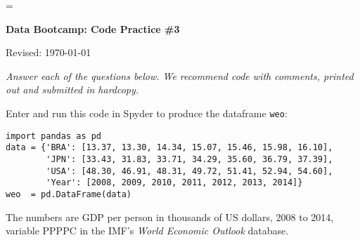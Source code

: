 \documentclass[11pt]{exam}
\begin{document}
\parskip=\bigskipamount
\parindent=0.0in
\thispagestyle{empty}


\bigskip\bigskip
\centerline{\Large \bf Data Bootcamp:  Code Practice \#3}
\centerline{Revised: \today}

{\it Answer each of the questions below.
We recommend code with comments, printed out and submitted in hardcopy.}

\begin{questions}
\item Enter and run this code in Spyder to produce the dataframe \texttt{weo}:
\begin{verbatim}
import pandas as pd
data = {'BRA': [13.37, 13.30, 14.34, 15.07, 15.46, 15.98, 16.10],
        'JPN': [33.43, 31.83, 33.71, 34.29, 35.60, 36.79, 37.39],
        'USA': [48.30, 46.91, 48.31, 49.72, 51.41, 52.94, 54.60],
        'Year': [2008, 2009, 2010, 2011, 2012, 2013, 2014]}
weo  = pd.DataFrame(data)
\end{verbatim}
The numbers are GDP per person in thousands of US dollars, 2008 to 2014,
variable PPPPC in the IMF's {\it World Economic Outlook\/} database.


\end{questions}
\end{document}
